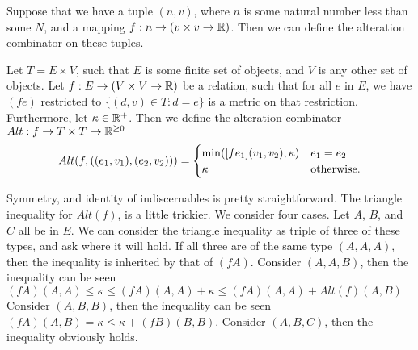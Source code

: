 Suppose that we have a tuple $(n, v)$, where $n$ is some natural number less than some $N$,
and a mapping $f : n \to (v \times v \to \mathbb{R})$.
Then we can define the alteration combinator on these tuples.

\begin{definition}
Let $T = E \times V$, such that $E$ is some finite set of objects, and $V$ is any other set of objects.
Let $f : E \to (V \times V \to \mathbb{R})$ be a relation, such that for all $e$ in $E$, 
we have $(f e)$ restricted to $\{ (d, v) \in T : d = e \}$ is a metric on that restriction.
Furthermore, let $\kappa \in \mathbb{R}^{+}$.
Then we define the alteration combinator $Alt : f \to T \times T \to \mathbb{R}^{\ge 0}$
$$ Alt(f, ((e_1, v_1), (e_2, v_2))) = \begin{cases}
    \min( [f e_1](v_1, v_2), \kappa) & e_1 = e_2 \\ 
    \kappa & \text{otherwise.}
\end{cases}$$
\end{definition}

Symmetry, and identity of indiscernables is pretty straightforward.
The triangle inequality for $Alt(f)$, is a little trickier.
We consider four cases. 
Let $A$, $B$, and $C$ all be in $E$.
We can consider the triangle inequality as triple of three of these types,
and ask where it will hold. 
If all three are of the same type $(A, A, A)$, then the inequality is inherited by that of $(f A)$.
Consider $(A, A, B)$, then the inequality can be seen $(f A)(A, A) \le \kappa \le (f A)(A, A) + \kappa \le (f A)(A, A) + Alt(f)(A, B)$
Consider $(A, B, B)$, then the inequality can be seen $(f A)(A, B) = \kappa \le \kappa + (f B)(B, B)$.
Consider $(A, B, C)$, then the inequality obviously holds.
